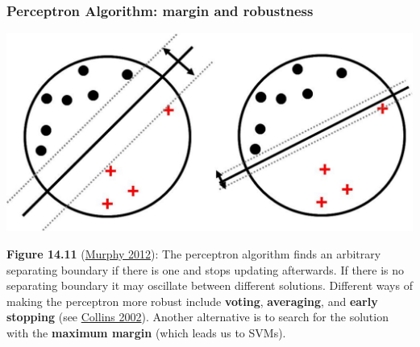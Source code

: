 \documentclass[ignorenonframetext,plain]{beamer}
\begin{document}
\begin{frame}\frametitle{Perceptron Algorithm: margin and robustness}
\begin{center}
\includegraphics[width=\textwidth]{images/largeMarginPrinciple2.pdf}
\end{center}\footnotesize
{\bf Figure 14.11} (\href{http://www.cs.ubc.ca/~murphyk/MLbook}{Murphy
  2012}): The perceptron algorithm finds an arbitrary separating
boundary if there is one and stops updating afterwards.  If there is
no separating boundary it may oscillate between different solutions.
Different ways of making the perceptron more robust include {\bf voting},
{\bf averaging}, and {\bf early stopping} (see
\href{http://aclweb.org/anthology//W/W02/W02-1001.pdf}{Collins 2002}).
Another alternative is to search for the solution with the {\bf
  maximum margin} (which leads us to SVMs).
\end{frame}
\end{document}
